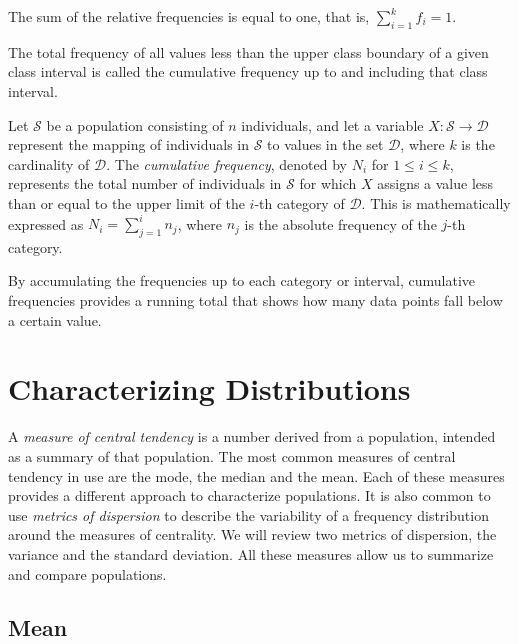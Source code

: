 The sum of the relative frequencies is equal to one, that is, $\sum_{i=1}^k f_i = 1$.

The total frequency of all values less than the upper class boundary of a given class interval is called the cumulative frequency up to and including that class interval.

\begin{definition}
Let $\mathcal{S}$ be a population consisting of $n$ individuals, and let a variable $X: \mathcal{S} \rightarrow \mathcal{D}$ represent the mapping of individuals in $\mathcal{S}$ to values in the set $\mathcal{D}$, where $k$ is the cardinality of $\mathcal{D}$. The \emph{cumulative frequency}, denoted by $N_i$ for $1 \leq i \leq k$, represents the total number of individuals in $\mathcal{S}$ for which $X$ assigns a value less than or equal to the upper limit of the $i$-th category of $\mathcal{D}$. This is mathematically expressed as $N_i = \sum_{j=1}^i n_j$, where $n_j$ is the absolute frequency of the $j$-th category.
\end{definition}

By accumulating the frequencies up to each category or interval, cumulative frequencies provides a running total that shows how many data points fall below a certain value.

%
%

\section{Characterizing Distributions}
\label{sec:measures_central_tendency}

A \emph{measure of central tendency} is a number derived from a population, intended as a summary of that population. The most common measures of central tendency in use are the mode, the median and the mean. Each of these measures provides a different approach to characterize populations. It is also common to use \emph{metrics of dispersion} to describe the variability of a frequency distribution around the measures of centrality. We will review two metrics of dispersion, the variance and the standard deviation. All these measures allow us to summarize and compare populations.


\subsection*{Mean}

